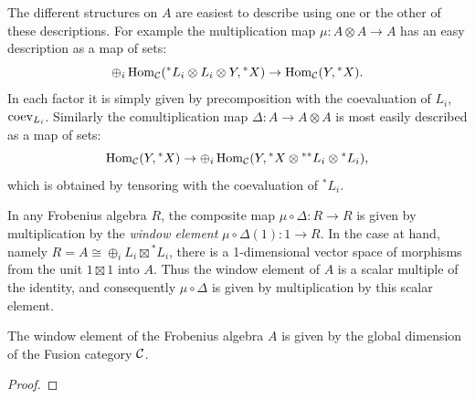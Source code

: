 \documentclass{amsart}
\begin{document}
The different structures on $A$ are easiest to describe using one or the other of these descriptions. For example the multiplication map $\mu: A \otimes A \to A$ has an easy description as a map of sets:
\begin{equation*}
	\oplus_i \operatorname{Hom}_{\mathcal C}({}^*L_i \otimes L_i \otimes Y, {}^*X) \to \operatorname{Hom}_{\mathcal C}(Y, {}^*X).
\end{equation*} 
In each factor it is simply given by precomposition with the coevaluation of $L_i$,  $\mathrm{coev}_{L_i}$. Similarly the comultiplication map
 $\Delta: A \to A \otimes A$ is most easily described as a map of sets:
\begin{equation*}
	\operatorname{Hom}_{\mathcal C}(Y, {}^*X) \to \oplus_i \operatorname{Hom}_{\mathcal C}(  Y, {}^*X \otimes {}^{**}L_i  \otimes {}^*L_i),
\end{equation*}
which is obtained by tensoring with the coevaluation of ${}^*L_i$.

In any Frobenius algebra $R$, the composite map $\mu \circ \Delta: R \to R$ is given by multiplication by the {\em window element} $\mu \circ \Delta(1): 1 \to R$. In the case at hand, namely $R = A \cong \oplus_i L_i \boxtimes {}^*L_i$, there is a 1-dimensional vector space of morphisms from the unit $1 \boxtimes 1$ into $A$. Thus the window element of $A$ is a scalar multiple of the identity, and consequently $\mu \circ \Delta$ is given by multiplication by this scalar element. 

\begin{proposition}
	The window element of the Frobenius algebra $A$ is given by the global dimension of the Fusion category $\mathcal C$. 
\end{proposition}

\begin{proof}
	

\end{proof}
\end{document}
